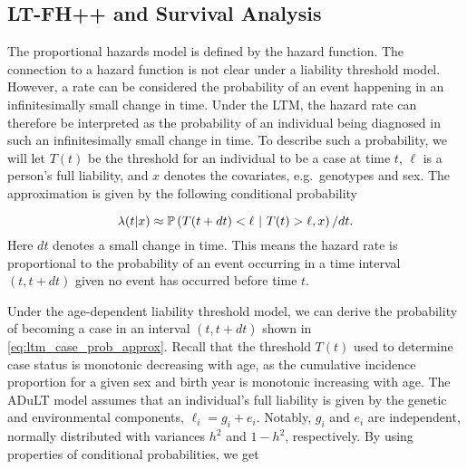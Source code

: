 
\subsection{LT-FH++ and Survival Analysis}
The proportional hazards model is defined by the hazard function. The connection to a hazard function is not clear under a liability threshold model. However, a rate can be considered the probability of an event happening in an infinitesimally small change in time. Under the LTM, the hazard rate can therefore be interpreted as the probability of an individual being diagnosed in such an infinitesimally small change in time\cite{kragh2021analysis}. To describe such a probability, we will let $ T(t) $ be the threshold for an individual to be a case at time $ t $, $ \ell $ is a person's full liability, and $ x $ denotes the covariates, e.g.\ genotypes and sex. The approximation is given by the following conditional probability

\begin{equation}\label{eq:ltm_case_prob_approx}
	\lambda(t|x) \approx 
	\mathbb{P}\left(T(t + dt) < \ell ~|~ T(t) > \ell, x \right) / dt.
\end{equation}
Here $ dt $ denotes a small change in time. This means the hazard rate is proportional to the probability of an event occurring in a time interval $ (t, t + dt) $ given no event has occurred before time $ t $.

%
Under the age-dependent liability threshold model, we can derive the probability of becoming a case in an interval $ (t, t+ dt) $ shown in \cref{eq:ltm_case_prob_approx}. Recall that the threshold $ T(t) $ used to determine case status is monotonic decreasing with age, as the cumulative incidence proportion for a given sex and birth year is monotonic increasing with age. The ADuLT model assumes that an individual's full liability is given by the genetic and environmental components, $ \ell_i = g_i + e_i $. Notably, $ g_i $ and $ e_i $ are independent, normally distributed with variances $ h^2 $ and $ 1 - h^2 $, respectively. By using properties of conditional probabilities, we get


